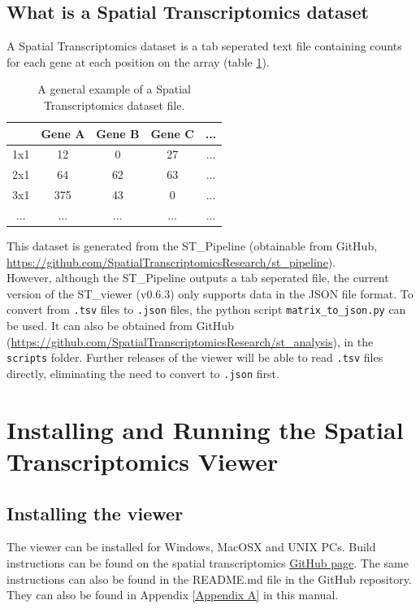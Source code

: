\documentclass[10pt,a4paper,titlepage]{book}
\begin{document}
\section{What is a Spatial Transcriptomics dataset}
A Spatial Transcriptomics dataset is a tab seperated text file containing counts for each gene at each position on the array (table \ref{tab:st_dataset}).

\begin{table}[h]
\begin{center}
\caption{A general example of a Spatial Transcriptomics dataset file.}
\begin{tabular}{c | cccc}
 & Gene A & Gene B & Gene C & ... \\ \hline
1x1 & 12 & 0 & 27 & ... \\
2x1 & 64 & 62 & 63 & ... \\
3x1 & 375 & 43 & 0 & ... \\
... & ... & ... & ... & ... \\
\end{tabular}
\label{tab:st_dataset}
\end{center}
\end{table}

This dataset is generated from the ST\_Pipeline (obtainable from GitHub,\\ \url{https://github.com/SpatialTranscriptomicsResearch/st_pipeline}).\\ However, although the ST\_Pipeline outputs a tab seperated file, the current version of the ST\_viewer (v0.6.3) only supports data in the JSON file format. To convert from \texttt{.tsv} files to \texttt{.json} files, the python script \texttt{matrix\_to\_json.py} can be used. It can also be obtained from GitHub (\url{https://github.com/SpatialTranscriptomicsResearch/st_analysis}), in the \texttt{scripts} folder. Further releases of the viewer will be able to read \texttt{.tsv} files directly, eliminating the need to convert to \texttt{.json} first.

\chapter{Installing and Running the Spatial Transcriptomics Viewer}
\section{Installing the viewer}
The viewer can be installed for Windows, MacOSX and UNIX PCs. Build instructions can be found on the spatial transcriptomics \href{https://github.com/SpatialTranscriptomicsResearch/st_viewer}{GitHub page}. The same instructions can also be found in the README.md file in the GitHub repository. They can also be found in Appendix \ref{Appendix A} in this manual.
\end{document}
